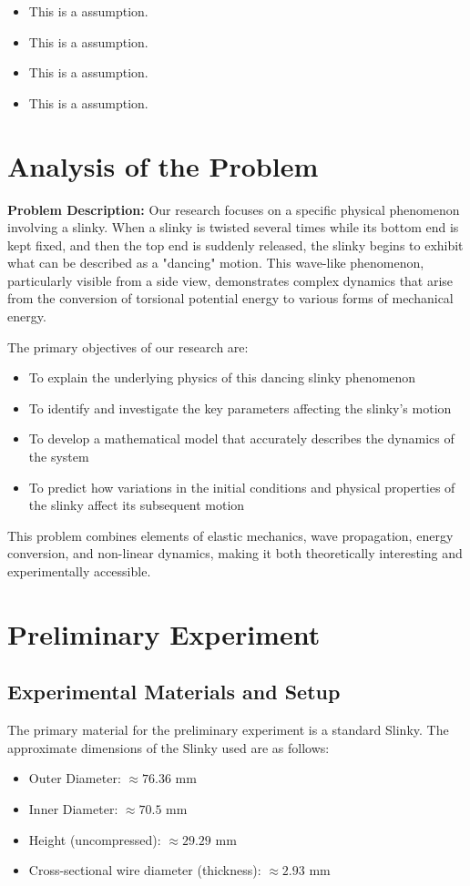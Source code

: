 \documentclass{mcmthesis}  %
\begin{document}
\begin{itemize}  %
\item This is a assumption.
\item This is a assumption.
\item This is a assumption.
\item This is a assumption.
\end{itemize}  %


\section{Analysis of the Problem}  %

\textbf{Problem Description:} Our research focuses on a specific physical phenomenon involving a slinky. When a slinky is twisted several times while its bottom end is kept fixed, and then the top end is suddenly released, the slinky begins to exhibit what can be described as a "dancing" motion. This wave-like phenomenon, particularly visible from a side view, demonstrates complex dynamics that arise from the conversion of torsional potential energy to various forms of mechanical energy. 

The primary objectives of our research are:
\begin{itemize}
\item To explain the underlying physics of this dancing slinky phenomenon
\item To identify and investigate the key parameters affecting the slinky's motion
\item To develop a mathematical model that accurately describes the dynamics of the system
\item To predict how variations in the initial conditions and physical properties of the slinky affect its subsequent motion
\end{itemize}

This problem combines elements of elastic mechanics, wave propagation, energy conversion, and non-linear dynamics, making it both theoretically interesting and experimentally accessible.

\section{Preliminary Experiment} %

\subsection{Experimental Materials and Setup} %
The primary material for the preliminary experiment is a standard Slinky. The approximate dimensions of the Slinky used are as follows:
\begin{itemize}
    \item Outer Diameter: \(\approx 76.36\) mm
    \item Inner Diameter: \(\approx 70.5\) mm
    \item Height (uncompressed): \(\approx 29.29\) mm
    \item Cross-sectional wire diameter (thickness): \(\approx 2.93\) mm
\end{itemize}
\end{document}
